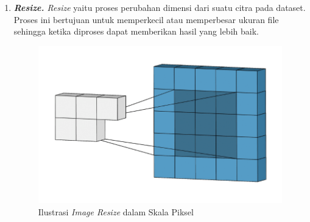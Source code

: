 \begin{enumerate}[nolistsep]
    \item \textit{\textbf{Resize.} Resize} yaitu proses perubahan dimensi dari suatu citra pada dataset. Proses ini bertujuan untuk memperkecil atau memperbesar ukuran file sehingga ketika diproses dapat memberikan hasil yang lebih baik. 
    \begin{figure}[H]
        \centering
        \includegraphics[scale=0.5]{gambar/imageresize.png}
        \caption{Ilustrasi \textit{Image Resize} dalam Skala Piksel}
        \label{fig:imageresize}
    \end{figure}


\end{enumerate}
